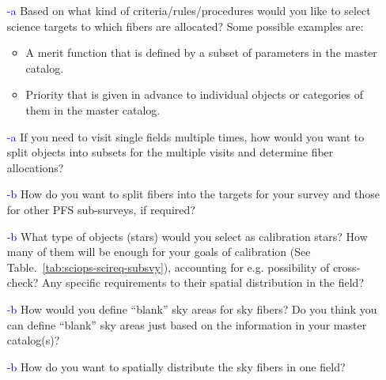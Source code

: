 \documentclass[a4paper,notitlepage]{article}
\newcommand{\coll}[1]{\textcolor{blue}{\thesubsubsection-#1}}
\begin{document}
\begin{enumerate}
  \item[\coll{a}] Based on what kind of criteria/rules/procedures would
           you like to select science targets to which fibers are
           allocated? Some possible examples are:
           \begin{itemize}
        \item A merit function that is defined by a subset of
              parameters in the master catalog.
        \item Priority that is given in advance to individual
              objects or categories of them in the master
              catalog.
           \end{itemize}
  \item[\coll{a}] If you need to visit single fields multiple times, how
           would you want to split objects into subsets for the
           multiple visits and determine fiber allocations?
  \item[\coll{b}] How do you want to split fibers into the targets for
           your survey and those for other PFS sub-surveys, if
           required?
  \item[\coll{b}] What type of objects (stars) would you select as
           calibration stars? How many of them will be enough for
           your goals of calibration (See
           Table.~\ref{tab:sciops-scireq-subsvy}), accounting for
           e.g. possibility of cross-check? Any specific
           requirements to their spatial distribution in the field?
  \item[\coll{b}] How would you define ``blank'' sky areas for sky
           fibers? Do you think you can define ``blank'' sky areas
           just based on the information in your master catalog(s)?
  \item[\coll{b}] How do you want to spatially distribute the sky fibers
           in one field?
\end{enumerate}
\end{document}
